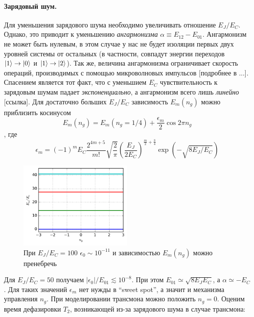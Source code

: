 \documentclass[12pt, twoside]{report}
\DeclarePairedDelimiter\ket{\lvert}{\rangle}
\numberwithin{equation}{section}
\numberwithin{figure}{section}
\begin{document}
\paragraph{Зарядовый шум.} Для уменьшения зарядового шума необходимо увеличивать отношение $E_J / E_C$. Однако, это приводит к уменьшению \textit{ангармонизма} $\alpha \equiv E_{12} - E_{01}$. Ангармонизм не может быть нулевым, в этом случае у нас не будет изоляции первых двух уровней системы от остальных (в частности, совпадут энергии переходов $\ket{1} \rightarrow \ket{0}$ и $\ket{1} \rightarrow \ket{2}$). Так же, величина ангармонизма ограничивает скорость операций, производимых с помощью микроволновых импульсов [подробнее в ...].
\newline
Спасением является тот факт, что с уменьшием $E_C$ чувствительность к зарядовым шумам падает \textit{экспоненциально}, а ангармонизм всего лишь \textit{линейно} [ссылка]. Для достаточно больших $E_J/E_C$ зависимость $E_m(n_g)$ можно приблизить косинусом 
\begin{equation}
E_m\left(n_g\right) = E_m(n_g = 1/4) + \frac{\epsilon_m}{2}  \cos 2 \pi n_g 
\label{eq:transmon-cos-ng}
\end{equation}
, где
\begin{equation}
\epsilon_m  = (-1)^m E_C \frac{2^{4m +5}}{m!} \sqrt{\frac{2}{\pi}} \left( \frac{E_J}{2 E_C} \right) ^ {\frac{m}{2} + \frac{3}{4}} \exp {\left( - \sqrt{8 E_J / E_C} \right)} 
\label{eq:transmon-noise-coef}
\end{equation}
\linebreak
\begin{figure}
\includegraphics[width=0.5\textwidth ]{Pictures2/transmon_100}
\caption{При $E_J/E_C = 100$ $\epsilon_0 \sim 10^{-11}$ и зависимостью $E_m(n_g)$ можно пренебречь}
\label{fig:transmon-eigens}
\end{figure}
Для $E_J/E_C = 50$ получаем $\left|\epsilon_0\right| /  E_{01} \lesssim 10^{-8}$. При этом $E_{01} \simeq \sqrt{8 E_J E_C}$, а $\alpha \simeq - E_C$.
Для таких значений $\epsilon_m$ нет нужды в ``sweet spot'', а значит и механизма управления $n_g$. При моделировании трансмона можно положить $n_g = 0$. Оценим время дефазировки $T_2$, возникающей из-за зарядового шума в случае трансмона:
\end{document}
